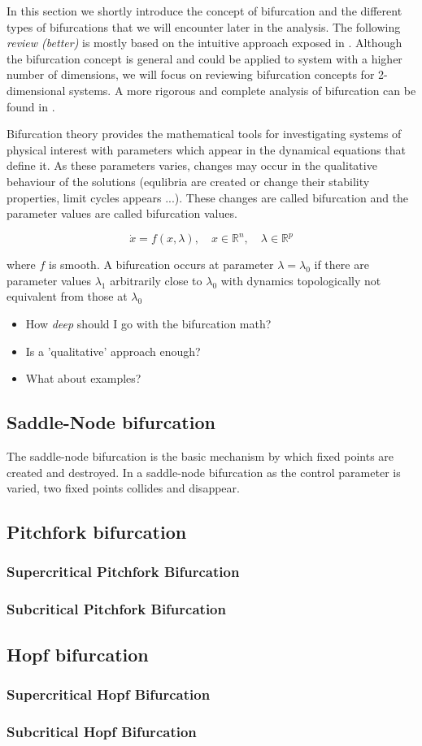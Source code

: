 
In this section we shortly introduce the concept of bifurcation and the different types of bifurcations that we will encounter later in the analysis. The following \textit{review (better)} is mostly based on the intuitive approach exposed in \cite{StrogatzNonlinear}. Although the bifurcation concept is general and could be applied to system with a higher number of dimensions, we will focus on reviewing bifurcation concepts for 2-dimensional systems. A more rigorous and complete analysis of bifurcation can be found in \cite{Guckenheimer1983}. 

Bifurcation theory provides the mathematical tools for investigating systems of physical interest with parameters which appear in the dynamical equations that define it. As these parameters varies, changes may occur in the qualitative behaviour of the solutions (equlibria are created or change their stability properties, limit cycles appears ...). These changes are called bifurcation and the parameter values are called bifurcation values. 

\begin{equation}
\dot{x}=f(x, \lambda), \quad x \in  \mathbb{R}  ^{n}, \quad  \lambda \in \mathbb{R}^{p}
\end{equation}

where $f$ is smooth. A bifurcation occurs at parameter $\lambda=\lambda_0$ if there are parameter values $\lambda_1$ arbitrarily close to $\lambda_0$ with dynamics topologically not equivalent from those at $\lambda_0$

\begin{itemize}
    \item How \textit{deep} should I go with the bifurcation math?
    \item Is a 'qualitative' approach enough?
    \item What about examples?
\end{itemize}

\subsection{Saddle-Node bifurcation}
The saddle-node bifurcation is the basic mechanism by which fixed points are created and destroyed. In a saddle-node bifurcation as the control parameter is varied, two fixed points collides and disappear. 
\subsection{Pitchfork bifurcation}
\subsubsection{Supercritical Pitchfork Bifurcation}
\subsubsection{Subcritical Pitchfork Bifurcation}
\subsection{Hopf bifurcation}
\subsubsection{Supercritical Hopf Bifurcation}
\subsubsection{Subcritical Hopf Bifurcation}